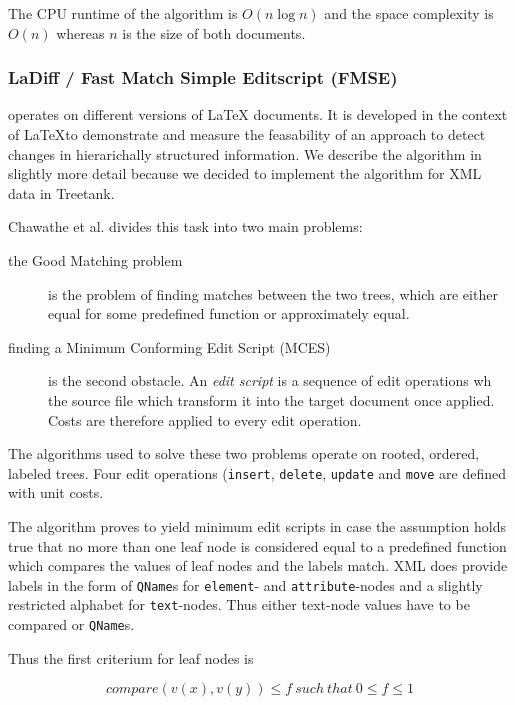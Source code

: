 The CPU runtime of the algorithm is $O(n \log n)$ and the space complexity is $O(n)$ whereas $n$ is the size of both documents.

\subsubsection{LaDiff / Fast Match Simple Editscript (FMSE)\cite{chawathe1996change}}\label{subsec::ladiff}
operates on different versions of LaTeX documents. It is developed in the context of \LaTeX to demonstrate and measure the feasability of an approach to detect changes in hierarichally structured information. We describe the algorithm in slightly more detail because we decided to implement the algorithm for XML data in Treetank.

Chawathe et al. divides this task into two main problems:

\begin{description}
\item[the Good Matching problem] is the problem of finding matches between the two trees, which are either equal for some predefined function or approximately equal.
\item[finding a Minimum Conforming Edit Script (MCES)] is the second obstacle. An \emph{edit script} is a sequence of edit operations wh the source file which transform it into the target document once applied. Costs are therefore applied to every edit operation.
\end{description}

The algorithms used to solve these two problems operate on rooted, ordered, labeled trees. Four edit operations (\texttt{insert}, \texttt{delete}, \texttt{update} and \texttt{move} are defined with unit costs.

The algorithm proves to yield minimum edit scripts in case the assumption holds true that no more than one leaf node is considered equal to a predefined function which compares the values of leaf nodes and the labels match. XML does provide labels in the form of \texttt{QName}s for \texttt{element}- and \texttt{attribute}-nodes and a slightly restricted alphabet for \texttt{text}-nodes. Thus either text-node values have to be compared or \texttt{QName}s.

Thus the first criterium for leaf nodes is 

\begin{equation} 
compare(v(x), v(y)) \leq f\ such\ that\ 0 \leq f \leq 1
\end{equation}

